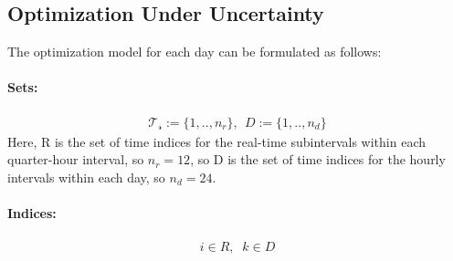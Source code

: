 \documentclass[11pt,twoside]{article}
\begin{document}
\subsection{Optimization Under Uncertainty}
The optimization model for each day can be formulated as follows:\\
\paragraph{Sets:}
\begin{subequations}
\begin{align}
\mathcal{T_r} := \{1,..,n_r\},\,\; D :=  \{1,..,n_d\}
\end{align}
\end{subequations}
Here, R is the set of time indices for the real-time subintervals within each quarter-hour interval, so $n_r=12$, so D is the set of time indices for the hourly intervals within each day, so $n_d=24$.\\
\paragraph{Indices:}
\begin{subequations}
\begin{align}
i \in R, \;\; k \in D
\end{align}
\end{subequations}
\end{document}
